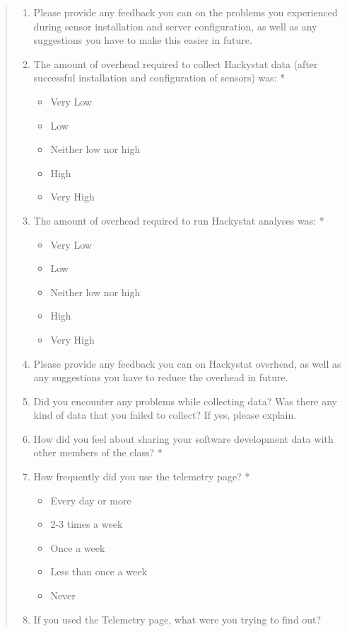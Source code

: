 \documentclass[11pt]{article}
\begin{document}
\begin{quote}
\begin{enumerate}
\item Please provide any feedback you can on the problems you experienced during sensor installation and server configuration, as well as any suggestions you have to make this easier in future.

\item The amount of overhead required to collect Hackystat data (after successful installation and configuration of sensors) was: *
\begin{itemize}
\item Very Low
\item Low
\item Neither low nor high
\item High
\item Very High
\end{itemize}

\item The amount of overhead required to run Hackystat analyses was: *
\begin{itemize}
\item Very Low
\item Low
\item Neither low nor high
\item High
\item Very High
\end{itemize}

\item Please provide any feedback you can on Hackystat overhead, as well as any suggestions you have to reduce the overhead in future.

\item Did you encounter any problems while collecting data? Was there any kind of data that you failed to collect? If yes, please explain.

\item How did you feel about sharing your software development data with other members of the class? *

\item How frequently did you use the telemetry page? *
\begin{itemize}
\item Every day or more
\item 2-3 times a week
\item Once a week
\item Less than once a week
\item Never
\end{itemize}

\item If you used the Telemetry page, what were you trying to find out?


\end{enumerate}
\end{quote}
\end{document}

